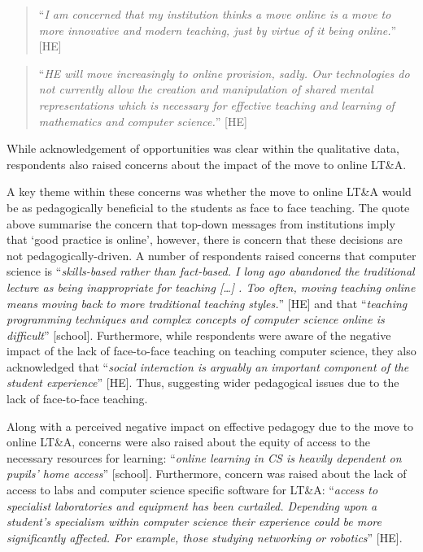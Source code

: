 \documentclass[sigconf]{acmart}
\begin{document}
\begin{quotation}
``{\emph{I am concerned that my institution thinks a move online is a
move to more innovative and modern teaching, just by virtue of it
being online.}}'' [HE]
\end{quotation}

\begin{quotation}
``{\emph{HE will move increasingly to online provision, sadly. Our
technologies do not currently allow the creation and manipulation of
shared mental representations which is necessary for effective
teaching and learning of mathematics and computer science.}}'' [HE]
\end{quotation}

While acknowledgement of opportunities was clear within the
qualitative data, respondents also raised concerns about the impact of
the move to online LT\&A.

A key theme within these concerns was whether the move to online LT\&A
would be as pedagogically beneficial to the students as face to face
teaching. The quote above summarise the concern that top-down messages
from institutions imply that `good practice is online', however, there
is concern that these decisions are not pedagogically-driven. A number
of respondents raised concerns that computer science is
``{\emph{skills-based rather than fact-based.  I long ago abandoned
the traditional lecture as being inappropriate for teaching […] .  Too
often, moving teaching online means moving back to more traditional
teaching styles.}}” [HE] and that ``{\emph{teaching programming
techniques and complex concepts of computer science online is
difficult}}'' [school]. Furthermore, while respondents were aware of
the negative impact of the lack of face-to-face teaching on teaching
computer science, they also acknowledged that ``{\emph{social
interaction is arguably an important component of the student
experience}}'' [HE]. Thus, suggesting wider pedagogical issues due to
the lack of face-to-face teaching.

Along with a perceived negative impact on effective pedagogy due to
the move to online LT\&A, concerns were also raised about the equity
of access to the necessary resources for learning: ``{\emph{online
learning in CS is heavily dependent on pupils' home access}}''
[school]. Furthermore, concern was raised about the lack of access to
labs and computer science specific software for LT\&A: ``{\emph{access
to specialist laboratories and equipment has been curtailed. Depending
upon a student’s specialism within computer science their experience
could be more significantly affected. For example, those studying
networking or robotics}}'' [HE].
\end{document}
